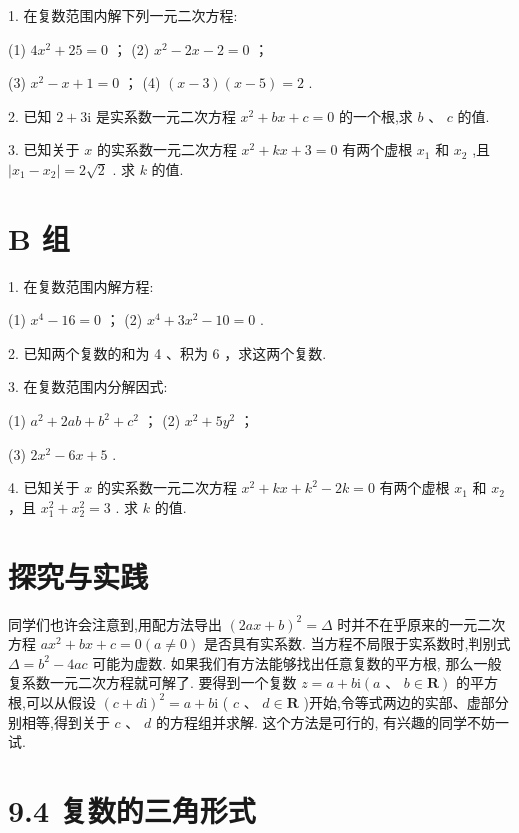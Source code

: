 \documentclass[10pt]{article}
\begin{document}
1. 在复数范围内解下列一元二次方程:

(1) \(4{x}^{2} + {25} = 0\) ； (2) \({x}^{2} - {2x} - 2 = 0\) ；

(3) \({x}^{2} - x + 1 = 0\) ； (4) \(\left( {x - 3}\right) \left( {x - 5}\right)  = 2\) .

2. 已知 \(2 + 3\mathrm{i}\) 是实系数一元二次方程 \({x}^{2} + {bx} + c = 0\) 的一个根,求 \(b\text{ 、 }c\) 的值.

3. 已知关于 \(x\) 的实系数一元二次方程 \({x}^{2} + {kx} + 3 = 0\) 有两个虚根 \({x}_{1}\) 和 \({x}_{2}\) ,且 \(\left| {{x}_{1} - {x}_{2}}\right|  = 2\sqrt{2}\) . 求 \(k\) 的值.

\section*{B 组}

1. 在复数范围内解方程:

(1) \({x}^{4} - {16} = 0\) ； (2) \({x}^{4} + 3{x}^{2} - {10} = 0\) .

2. 已知两个复数的和为 4 、积为 6 ，求这两个复数.

3. 在复数范围内分解因式:

(1) \({a}^{2} + {2ab} + {b}^{2} + {c}^{2}\) ； (2) \({x}^{2} + 5{y}^{2}\) ；

(3) \(2{x}^{2} - {6x} + 5\) .

4. 已知关于 \(x\) 的实系数一元二次方程 \({x}^{2} + {kx} + {k}^{2} - {2k} = 0\) 有两个虚根 \({x}_{1}\) 和 \({x}_{2}\) ，且 \({x}_{1}^{2} + {x}_{2}^{2} = 3\) . 求 \(k\) 的值.

\section*{探究与实践}

同学们也许会注意到,用配方法导出 \({\left( 2ax + b\right) }^{2} = \Delta\) 时并不在乎原来的一元二次方程 \(a{x}^{2} + {bx} + c = 0\left( {a \neq  0}\right)\) 是否具有实系数. 当方程不局限于实系数时,判别式 \(\Delta  = {b}^{2} - {4ac}\) 可能为虚数. 如果我们有方法能够找出任意复数的平方根, 那么一般复系数一元二次方程就可解了. 要得到一个复数 \(z = a + b\mathrm{i}\left( {a\text{ 、 }b \in  \mathbf{R}}\right)\) 的平方根,可以从假设 \({\left( c + d\mathrm{i}\right) }^{2} = a + b\mathrm{i}\) ( \(c\text{ 、 }d \in  \mathbf{R}\) )开始,令等式两边的实部、虚部分别相等,得到关于 \(c\text{ 、 }d\) 的方程组并求解. 这个方法是可行的, 有兴趣的同学不妨一试.

\section*{9.4 复数的三角形式}
\end{document}
